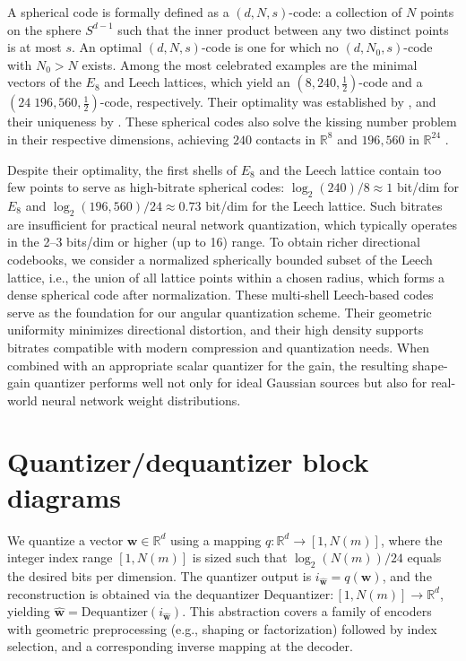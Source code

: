 \documentclass{article}
\theoremstyle{plain}
\theoremstyle{definition}
\theoremstyle{remark}
\begin{document}
A spherical code is formally defined as a $(d, N, s)$-code: a collection of $N$ points on the sphere $S^{d-1}$ such that the inner product between any two distinct points is at most $s$. An optimal $(d, N, s)$-code is one for which no $(d, N_0, s)$-code with $N_0 > N$ exists. Among the most celebrated examples are the minimal vectors of the $E_8$ and Leech lattices, which yield an $(8, 240, \tfrac{1}{2})$-code and a $(24\; 196{,}560, \tfrac{1}{2})$-code, respectively. Their optimality was established by \citet{kabatiansky1978bounds, odlyzko1979new}, and their uniqueness by \citet{bannai1981uniqueness}. These spherical codes also solve the kissing number problem in their respective dimensions, achieving $240$ contacts in $\mathbb{R}^8$ and $196{,}560$ in $\mathbb{R}^{24}$ \citep{ericson2001codes, conway2013sphere}.

Despite their optimality, the first shells of $E_8$ and the Leech lattice contain too few points to serve as high-bitrate spherical codes: $\log_2(240)/8 \approx 1$ bit/dim for $E_8$ and $\log_2(196{,}560)/24 \approx 0.73$ bit/dim for the Leech lattice. Such bitrates are insufficient for practical neural network quantization, which typically operates in the 2--3 bits/dim or higher (up to 16) range. To obtain richer directional codebooks, we consider a normalized spherically bounded subset of the Leech lattice, i.e., the union of all lattice points within a chosen radius, which forms a dense spherical code after normalization. These multi-shell Leech-based codes serve as the foundation for our angular quantization scheme. Their geometric uniformity minimizes directional distortion, and their high density supports bitrates compatible with modern compression and quantization needs. When combined with an appropriate scalar quantizer for the gain, the resulting shape-gain quantizer performs well not only for ideal Gaussian sources but also for real-world neural network weight distributions.



\newpage
\section{Quantizer/dequantizer block diagrams}
\label{sec:qd-blocks}

We quantize a vector $\mathbf{w}\in\mathbb{R}^d$ using a mapping $q:\mathbb{R}^d\to[1,N(m)]$, where the integer index range $[1,N(m)]$ is sized such that $\log_2(N(m))/24$ equals the desired bits per dimension. The quantizer output is $i_{\hat{\mathbf{w}}}=q(\mathbf{w})$, and the reconstruction is obtained via the dequantizer $\text{Dequantizer}:[1,N(m)]\to\mathbb{R}^d$, yielding $\hat{\mathbf{w}}=\text{Dequantizer}(i_{\hat{\mathbf{w}}})$. This abstraction covers a family of encoders with geometric preprocessing (e.g., shaping or factorization) followed by index selection, and a corresponding inverse mapping at the decoder.
\end{document}

